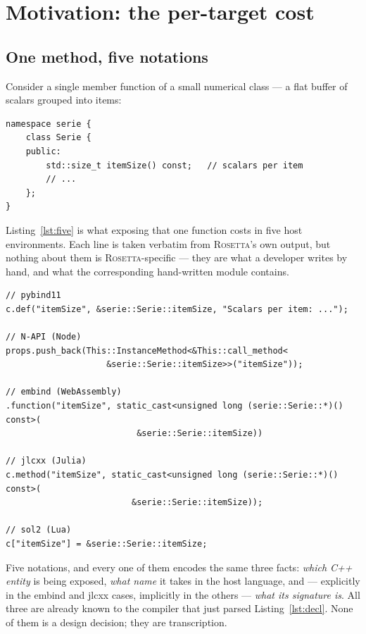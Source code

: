 \documentclass[11pt,a4paper]{article}
\newcommand{\rosetta}{\textsc{Rosetta}}
\begin{document}
\section{Motivation: the per-target cost}
\label{sec:motivation}

\subsection{One method, five notations}

Consider a single member function of a small numerical class --- a flat buffer
of scalars grouped into items:

\begin{lstlisting}[caption={The declaration. Everything below is derived from it.},label={lst:decl}]
namespace serie {
    class Serie {
    public:
        std::size_t itemSize() const;   // scalars per item
        // ...
    };
}
\end{lstlisting}

Listing~\ref{lst:five} is what exposing that one function costs in five host
environments. Each line is taken verbatim from \rosetta's own output, but
nothing about them is \rosetta-specific --- they are what a developer writes by
hand, and what the corresponding hand-written module contains.

\begin{lstlisting}[caption={The same member function, five times.},label={lst:five}]
// pybind11
c.def("itemSize", &serie::Serie::itemSize, "Scalars per item: ...");

// N-API (Node)
props.push_back(This::InstanceMethod<&This::call_method<
                    &serie::Serie::itemSize>>("itemSize"));

// embind (WebAssembly)
.function("itemSize", static_cast<unsigned long (serie::Serie::*)() const>(
                          &serie::Serie::itemSize))

// jlcxx (Julia)
c.method("itemSize", static_cast<unsigned long (serie::Serie::*)() const>(
                         &serie::Serie::itemSize));

// sol2 (Lua)
c["itemSize"] = &serie::Serie::itemSize;
\end{lstlisting}

Five notations, and every one of them encodes the same three facts: \emph{which
C++ entity} is being exposed, \emph{what name} it takes in the host language,
and --- explicitly in the embind and jlcxx cases, implicitly in the others ---
\emph{what its signature is}. All three are already known to the compiler that
just parsed Listing~\ref{lst:decl}. None of them is a design decision; they are
transcription.
\end{document}
